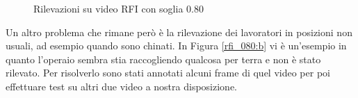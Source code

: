 \begin{figure}[]
    \begin{minipage}{.5\linewidth}
        \centering
    \end{minipage}%
    \begin{minipage}{.5\linewidth}
        \centering
    \end{minipage}
    \centering
    \caption{Rilevazioni su video RFI con soglia 0.80}
    \label{fig:rfi_080}
\end{figure}

Un altro problema che rimane però è la rilevazione dei lavoratori in posizioni non usuali, ad esempio quando sono chinati. In Figura \ref{rfi_080:b} vi è un'esempio in quanto l'operaio sembra stia raccogliendo qualcosa per terra e non è stato rilevato. Per risolverlo sono stati annotati alcuni frame di quel video per poi effettuare test su altri due video a nostra disposizione. 
